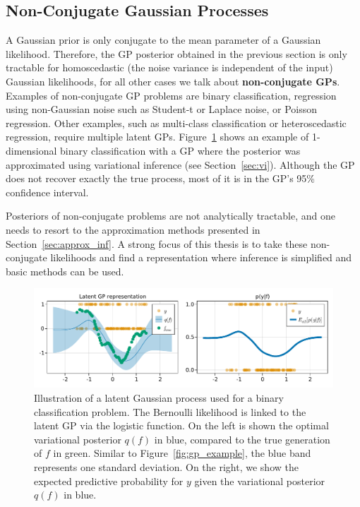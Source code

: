 \subsection{Non-Conjugate Gaussian Processes}
\label{sec:nonconj_gps}
A Gaussian prior is only conjugate to the mean parameter of a Gaussian likelihood.
Therefore, the \ac{GP} posterior obtained in the previous section is only tractable for homoscedastic (the noise variance is independent of the input) Gaussian likelihoods, for all other cases we talk about \textbf{non-conjugate \acp{GP}}.
Examples of non-conjugate \ac{GP} problems are binary classification, regression using non-Gaussian noise such as Student-t or Laplace noise, or Poisson regression.
Other examples, such as multi-class classification or heteroscedastic regression, require multiple latent \acp{GP}.
Figure~\ref{fig:gp_class_example} shows an example of 1-dimensional binary classification with a \ac{GP} where the posterior was approximated using variational inference (see Section~\ref{sec:vi}).
Although the \ac{GP} does not recover exactly the true process, most of it is in the \ac{GP}'s 95\% confidence interval.

Posteriors of non-conjugate problems are not analytically tractable, and one needs to resort to the approximation methods presented in Section~\ref{sec:approx_inf}.
A strong focus of this thesis is to take these non-conjugate likelihoods and find a representation where inference is simplified and basic methods can be used.

\begin{figure}
    \includegraphics[width=\textwidth]{./chapters/2_background/figures/GP_classification_example.pdf}
    \caption{Illustration of a latent Gaussian process used for a binary classification problem.
    The Bernoulli likelihood is linked to the latent \ac{GP} via the logistic function.
    On the left is shown the optimal variational posterior $q(f)$ in blue, compared to the true generation of $f$ in green.
    Similar to Figure~\ref{fig:gp_example}, the blue band represents one standard deviation.
    On the right, we show the expected predictive probability for $y$ given the variational posterior $q(f)$ in blue.}
    \label{fig:gp_class_example}
\end{figure}

